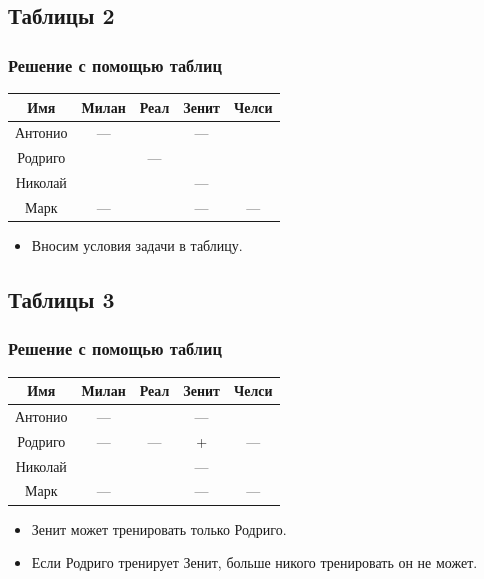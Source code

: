\documentclass[compress,red]{beamer}
\begin{document}
\subsection{Таблицы 2}
\begin{frame}[fragile]
  \frametitle{Решение с помощью таблиц}
  
  \center
  {
  \begin{tabular}{|c|c|c|c|c|}
    \hline
    Имя & Милан & Реал  & Зенит & Челси \\
    \hline
    Антонио & --- &   & --- & \\
    \hline
    Родриго &  & ---  &  & \\
    \hline
    Николай &  &   & ---  & \\ 
    \hline
    Марк & --- &   & --- & --- \\
    \hline
  \end{tabular}
  }
  \begin{itemize}
    \item Вносим условия задачи в таблицу.
  \end{itemize}
\end{frame}

\subsection{Таблицы 3}
\begin{frame}[fragile]
  \frametitle{Решение с помощью таблиц}
  
  \center
  {
  \begin{tabular}{|c|c|c|c|c|}
    \hline
    Имя & Милан & Реал  & Зенит & Челси \\
    \hline
    Антонио & --- &   & --- & \\
    \hline
    Родриго & ---  & ---  & +  & --- \\
    \hline
    Николай &  &   & ---  & \\ 
    \hline
    Марк & --- &   & --- & --- \\
    \hline
  \end{tabular}
  }
  \begin{itemize}
    \item Зенит может тренировать только Родриго.
    \item Если Родриго тренирует Зенит, больше никого тренировать он не может.
  \end{itemize}
\end{frame}
\end{document}
